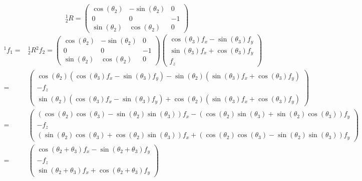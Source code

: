 \documentclass[10pt,a4paper]{article}
\begin{document}
\begin{equation*}
  {}^{1}_{2}R = \begin{pmatrix}
    \cos(\theta_{2}) & - \sin(\theta_{2}) & 0\\
    0 & 0 & -1\\
    \sin(\theta_{2}) & \cos(\theta_{2}) & 0
  \end{pmatrix}
\end{equation*}
\begin{align*}
  {}^{1}f_{1} = & {}^{1}_{2}R {}^{2}f_{2} = \begin{pmatrix}
    \cos(\theta_{2}) & - \sin(\theta_{2}) & 0\\
    0 & 0 & -1\\
    \sin(\theta_{2}) & \cos(\theta_{2}) & 0
  \end{pmatrix} \begin{pmatrix}
    \cos(\theta_{3})f_{x} - \sin(\theta_{3})f_{y}\\
    \sin(\theta_{3})f_{x} + \cos(\theta_{3})f_{y}\\
    f_{z}
  \end{pmatrix}\\
  = & \begin{pmatrix}
    \cos(\theta_{2})(\cos(\theta_{3})f_{x} - \sin(\theta_{3})f_{y}) - \sin(\theta_{2})(\sin(\theta_{3})f_{x} + \cos(\theta_{3})f_{y})\\
    -f_{z}\\
    \sin(\theta_{2})(\cos(\theta_{3})f_{x} - \sin(\theta_{3})f_{y}) + \cos(\theta_{2})(\sin(\theta_{3})f_{x} + \cos(\theta_{3})f_{y})
  \end{pmatrix}\\
  = & \begin{pmatrix}
    \left( \cos(\theta_{2})\cos(\theta_{3}) - \sin(\theta_{2})\sin(\theta_{3}) \right)f_{x} - \left( \cos(\theta_{2})\sin(\theta_{3}) + \sin(\theta_{2})\cos(\theta_{3}) \right)f_{y}\\
    -f_{z}\\
    \left( \sin(\theta_{2})\cos(\theta_{3}) + \cos(\theta_{2})\sin(\theta_{3}) \right)f_{x} + \left( \cos(\theta_{2})\cos(\theta_{3}) - \sin(\theta_{2})\sin(\theta_{3}) \right)f_{y}
  \end{pmatrix}\\
  = & \begin{pmatrix}
    \cos(\theta_{2} + \theta_{3})f_{x} - \sin(\theta_{2} + \theta_{3})f_{y}\\
    -f_{z}\\
    \sin(\theta_{2} + \theta_{3})f_{x} + \cos(\theta_{2} + \theta_{3})f_{y}
  \end{pmatrix}
\end{align*}
\end{document}
